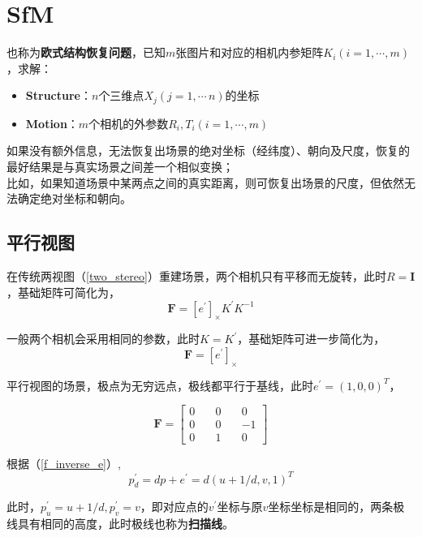 \section{SfM}
	 也称为\textbf{欧式结构恢复问题}，已知$m$张图片和对应的相机内参矩阵$K_i(i=1,\cdots,m)$，求解：
	\begin{itemize}
		\item \textbf{Structure}：$n$个三维点$X_j(j=1,\cdots\,n)$的坐标
		\item \textbf{Motion}：$m$个相机的外参数$R_i,T_i(i=1,\cdots,m)$
	\end{itemize}		
	
	如果没有额外信息，无法恢复出场景的绝对坐标（经纬度）、朝向及尺度，恢复的最好结果是与真实场景之间差一个相似变换；\\

	比如，如果知道场景中某两点之间的真实距离，则可恢复出场景的尺度，但依然无法确定绝对坐标和朝向。

	\subsection{平行视图}
		在传统两视图（\ref{two_stereo}）重建场景，两个相机只有平移而无旋转，此时$R = \mathbf{I}$，基础矩阵可简化为，
		$$
			\mathbf{F} = [e^\prime]_{\times}K^{\prime}K^{-1}
		$$

		一般两个相机会采用相同的参数，此时$K = K^\prime$，基础矩阵可进一步简化为，
		$$
			\mathbf{F} = [e^\prime]_{\times}
		$$

		平行视图的场景，极点为无穷远点，极线都平行于基线，此时$e^\prime = (1,0,0)^T$，

		$$
			\mathbf{F} =  \begin{bmatrix}
				0\quad & 0\quad& 0\\
				0\quad & 0\quad& -1\\
				0\quad & 1\quad& 0
			\end{bmatrix}
		$$

		根据（\ref{f_inverse_e}）,
		\begin{equation}
			p^\prime_d = dp + e^\prime = d(u+1/d,v,1)^T \label{disparity_pair}
		\end{equation}

		此时，$p^\prime_u = u + 1/d, p^\prime_v = v$，即对应点的$v^\prime$坐标与原$v$坐标坐标是相同的，两条极线具有相同的高度，此时极线也称为\textbf{扫描线}。

